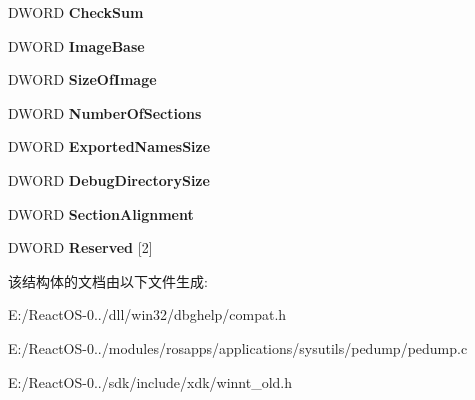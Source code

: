 \begin{DoxyCompactItemize}
D\+W\+O\+RD {\bfseries Check\+Sum}
\item 
\mbox{\label{struct___i_m_a_g_e___s_e_p_a_r_a_t_e___d_e_b_u_g___h_e_a_d_e_r_afa9edfab74e71c8f2ab75520c4f9980f}} 
D\+W\+O\+RD {\bfseries Image\+Base}
\item 
\mbox{\label{struct___i_m_a_g_e___s_e_p_a_r_a_t_e___d_e_b_u_g___h_e_a_d_e_r_a6835192eb49144d144044d6fdc8af657}} 
D\+W\+O\+RD {\bfseries Size\+Of\+Image}
\item 
\mbox{\label{struct___i_m_a_g_e___s_e_p_a_r_a_t_e___d_e_b_u_g___h_e_a_d_e_r_a8f6d82518badeb9f12698332238a4ff4}} 
D\+W\+O\+RD {\bfseries Number\+Of\+Sections}
\item 
\mbox{\label{struct___i_m_a_g_e___s_e_p_a_r_a_t_e___d_e_b_u_g___h_e_a_d_e_r_a0ad5ab676dd433c47730ea13404841f3}} 
D\+W\+O\+RD {\bfseries Exported\+Names\+Size}
\item 
\mbox{\label{struct___i_m_a_g_e___s_e_p_a_r_a_t_e___d_e_b_u_g___h_e_a_d_e_r_a0fa8e2f5b5cd07e8d8181c1ae194f541}} 
D\+W\+O\+RD {\bfseries Debug\+Directory\+Size}
\item 
\mbox{\label{struct___i_m_a_g_e___s_e_p_a_r_a_t_e___d_e_b_u_g___h_e_a_d_e_r_aad595d9c394572e73d57f2e696066137}} 
D\+W\+O\+RD {\bfseries Section\+Alignment}
\item 
\mbox{\label{struct___i_m_a_g_e___s_e_p_a_r_a_t_e___d_e_b_u_g___h_e_a_d_e_r_a491845a0c845e034e79938229ab3af57}} 
D\+W\+O\+RD {\bfseries Reserved} \mbox{[}2\mbox{]}
\end{DoxyCompactItemize}


该结构体的文档由以下文件生成\+:\begin{DoxyCompactItemize}
\item 
E\+:/\+React\+O\+S-\/0../dll/win32/dbghelp/compat.\+h\item 
E\+:/\+React\+O\+S-\/0../modules/rosapps/applications/sysutils/pedump/pedump.\+c\item 
E\+:/\+React\+O\+S-\/0../sdk/include/xdk/winnt\+\_\+old.\+h\end{DoxyCompactItemize}

